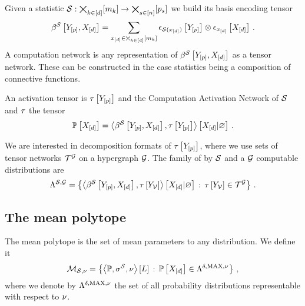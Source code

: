 \documentclass[aps,onecolumn,nofootinbib,pra]{article}
\begin{document}
    \subsection{\ComputationActivationNetworks{}}

    Given a statistic $\mathcal{S}:\bigtimes_{k\in[d]}[m_{k}]\rightarrow\bigtimes_{s\in[n]}[p_{s}]$ we build its basis encoding tensor
    \begin{align*}
        \beta^{\mathcal{S}}\left[Y_{[p]},X_{[d]}\right] = \sum_{x_{[d]}\in\bigtimes_{k\in[d]}[m_{k}]} \epsilon_{\mathcal{S}(x_{[d]})}\left[Y_{[p]}\right] \otimes \epsilon_{x_{[d]}}\left[X_{[d]}\right] \, .
    \end{align*}
    A computation network is any representation of $\beta^{\mathcal{S}}\left[Y_{[p]},X_{[d]}\right]$ as a tensor network.
    These can be constructed in the case statistics being a composition of connective functions.

    An activation tensor is $\tau\left[Y_{[p]}\right]$ and the Computation Activation Network of $\mathcal{S}$ and $\tau$ the tensor
    \begin{align*}
        \mathbb{P}\left[X_{[d]}\right] = \left\langle \beta^{\mathcal{S}}\left[Y_{[p]},X_{[d]}\right],\tau\left[Y_{[p]}\right]\right\rangle \left[ X_{[d]} | \varnothing \right] \, .
    \end{align*}

    We are interested in decomposition formats of $\tau\left[Y_{[p]}\right]$, where we use sets of tensor networks $\mathcal{T}^{\mathcal{G}}$ on a hypergraph $\mathcal{G}$.
    The family of by $\mathcal{S}$ and a $\mathcal{G}$ computable distributions are
    \begin{align*}
        \Lambda^{\mathcal{S},\mathcal{G}}
        = \left\{ \left\langle \beta^{\mathcal{S}}\left[Y_{[p]},X_{[d]}\right],\tau\left[Y_{\mathcal{V}}\right]
        \right\rangle \left[ X_{[d]} | \varnothing \right]
        \,:\, \tau\left[Y_{\mathcal{V}}\right] \in \mathcal{T}^{\mathcal{G}} \right\} \, .
    \end{align*}

    \subsection{The mean polytope}

    The mean polytope is the set of mean parameters to any distribution.
    We define it
    \begin{align*}
        \mathcal{M}_{\mathcal{S},\nu}
        = \left\{\left\langle \mathbb{P},\sigma^{\mathcal{S}},\nu\right\rangle \left[ L \right]\,:\,\mathbb{P}\left[X_{[d]}\right]\in\Lambda^{\delta,\mathrm{MAX},\nu} \right\} \, ,
    \end{align*}
    where we denote by $\Lambda^{\delta,\mathrm{MAX},\nu}$ the set of all probability distributions representable with respect to $\nu$.
\end{document}

